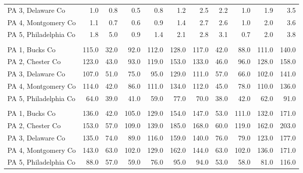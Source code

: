 \begin{longtable}[l]{l|rrrrrrrrrr}
\hspace{1em}PA 3, Delaware Co & 1.0 & 0.8 & 0.5 & 0.8 & 1.2 & 2.5 & 2.2 & 1.0 & 1.9 & 3.5\\
\hspace{1em}PA 4, Montgomery Co & 1.1 & 0.7 & 0.6 & 0.9 & 1.4 & 2.7 & 2.6 & 1.0 & 2.0 & 3.6\\
\hspace{1em}PA 5, Philadelphia Co & 1.8 & 5.0 & 0.9 & 1.4 & 2.1 & 2.8 & 3.1 & 0.7 & 2.0 & 3.8\\
\addlinespace[0.5em]
\multicolumn{11}{l}{\textbf{Median income}}\\
\hspace{1em}PA 1, Bucks Co & 115.0 & 32.0 & 92.0 & 112.0 & 128.0 & 117.0 & 42.0 & 88.0 & 111.0 & 140.0\\
\hspace{1em}PA 2, Chester Co & 123.0 & 43.0 & 93.0 & 119.0 & 153.0 & 133.0 & 46.0 & 96.0 & 128.0 & 158.0\\
\hspace{1em}PA 3, Delaware Co & 107.0 & 51.0 & 75.0 & 95.0 & 129.0 & 111.0 & 57.0 & 66.0 & 102.0 & 141.0\\
\hspace{1em}PA 4, Montgomery Co & 114.0 & 42.0 & 86.0 & 111.0 & 134.0 & 112.0 & 45.0 & 78.0 & 110.0 & 136.0\\
\hspace{1em}PA 5, Philadelphia Co & 64.0 & 39.0 & 41.0 & 59.0 & 77.0 & 70.0 & 38.0 & 42.0 & 62.0 & 91.0\\
\addlinespace[0.5em]
\multicolumn{11}{l}{\textbf{Mean income}}\\
\hspace{1em}PA 1, Bucks Co & 136.0 & 42.0 & 105.0 & 129.0 & 154.0 & 147.0 & 53.0 & 111.0 & 132.0 & 171.0\\
\hspace{1em}PA 2, Chester Co & 153.0 & 57.0 & 109.0 & 139.0 & 185.0 & 168.0 & 60.0 & 119.0 & 162.0 & 203.0\\
\hspace{1em}PA 3, Delaware Co & 135.0 & 74.0 & 89.0 & 116.0 & 159.0 & 140.0 & 76.0 & 79.0 & 123.0 & 177.0\\
\hspace{1em}PA 4, Montgomery Co & 143.0 & 63.0 & 102.0 & 129.0 & 162.0 & 144.0 & 63.0 & 102.0 & 136.0 & 171.0\\
\hspace{1em}PA 5, Philadelphia Co & 88.0 & 57.0 & 59.0 & 76.0 & 95.0 & 94.0 & 53.0 & 58.0 & 81.0 & 116.0\\

\end{longtable}
